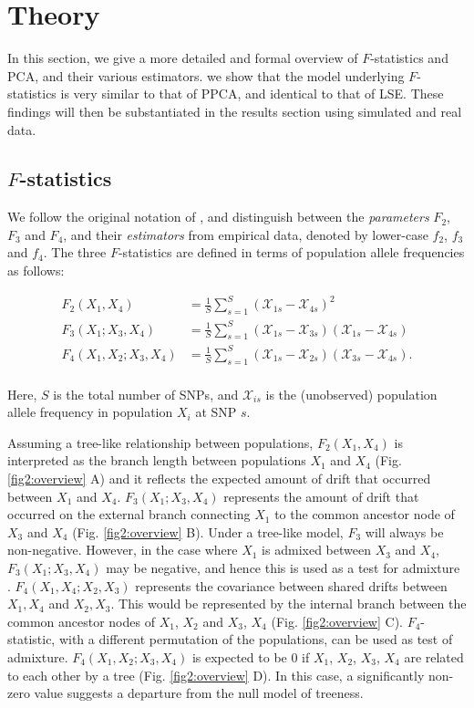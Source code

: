 \documentclass[12pt]{article}
\begin{document}
\section{Theory}\label{theory}
In this section, we give a more detailed and formal overview of $F$-statistics and PCA, and their various estimators. we show that the model underlying $F$-statistics is very similar to that of PPCA, and identical to that of LSE. These findings will then be substantiated in the results section using simulated and real data.

\subsection{$F$-statistics}\label{fstats}
We follow the original notation of \cite{patterson_ancient_2012}, and distinguish between the \textit{parameters} $F_2$, $F_3$ and $F_4$, and their \textit{estimators} from empirical data, denoted by lower-case $f_2$, $f_3$ and $f_4$. The three $F$-statistics are defined in terms of population allele frequencies as follows:

\begin{align}\label{eq:f_intro}
F_2(X_1,X_4) &= \frac{1}{S}\sum_{s=1}^S(\mathcal{X}_{1s} - \mathcal{X}_{4s})^2\nonumber\\
F_3(X_1;X_3,X_4) &= \frac{1}{S}\sum_{s=1}^S(\mathcal{X}_{1s} - \mathcal{X}_{3s})(\mathcal{X}_{1s} - \mathcal{X}_{4s})\nonumber\\
F_4(X_1,X_2;X_3,X_4) &= \frac{1}{S}\sum_{s=1}^S(\mathcal{X}_{1s} - \mathcal{X}_{2s})(\mathcal{X}_{3s} - \mathcal{X}_{4s}).\nonumber\\
\end{align}

Here, $S$ is the total number of SNPs, and $\mathcal{X}_{is}$ is the (unobserved) population allele frequency in population $X_i$ at SNP $s$. 

Assuming a tree-like relationship between populations, $F_2(X_1,X_4)$ is interpreted as the branch length between populations $X_1$ and $X_4$ (Fig. \ref{fig2:overview} A) and it reflects the expected amount of drift that occurred between $X_1$ and $X_4$. $F_3(X_1;X_3,X_4)$ represents the amount of drift that occurred on the external branch connecting $X_1$ to the common ancestor node of $X_3$ and $X_4$ (Fig. \ref{fig2:overview} B). Under a tree-like model, $F_3$ will always be non-negative. However, in the case where $X_1$ is admixed between $X_3$ and $X_4$, $F_3(X_1;X_3,X_4)$ may be negative, and hence this is used as a test for admixture \citep{peter_admixture_2016, patterson_ancient_2012}. $F_4(X_1,X_4;X_2,X_3)$ represents the covariance between shared drifts between $X_1,X_4$ and $X_2,X_3$. This would be represented by the internal branch between the common ancestor nodes of $X_1$, $X_2$ and $X_3$, $X_4$ (Fig. \ref{fig2:overview} C). $F_4$- statistic, with a different permutation of the populations, can be used as test of admixture. $F_4(X_1,X_2;X_3,X_4)$ is expected to be 0 if $X_1$, $X_2$, $X_3$, $X_4$ are related to each other by a tree (Fig. \ref{fig2:overview} D). In this case, a significantly non-zero value suggests a departure from the null model of treeness.
\end{document}
